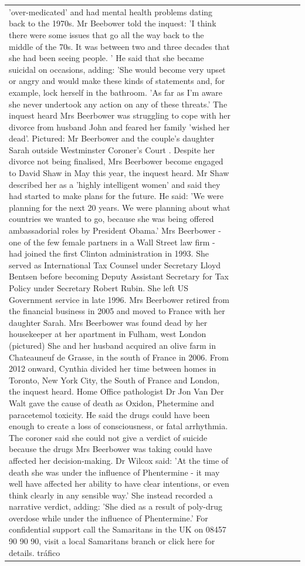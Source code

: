 \begin{table}[H]
\begin{tabular}{lllrlllll}
'over-medicated' and had mental health problems dating back to the 1970s. Mr Beebower told the inquest: 'I think there were some issues that go all the way back to the middle of the 70s. It was between two and three decades that she had been seeing people. ' He said that she became suicidal on occasions, adding: 'She would become very upset or angry and would make these kinds of statements and, for example, lock herself in the bathroom. 'As far as I'm aware she never undertook any action on any of these threats.' The inquest heard Mrs Beerbower was struggling to cope with her divorce from husband John and feared her family 'wished her dead'. Pictured: Mr Beerbower and the couple's daughter Sarah outside Westminster Coroner's Court . Despite her divorce not being finalised, Mrs Beerbower become engaged to David Shaw in May this year, the inquest heard. Mr Shaw described her as a 'highly intelligent women' and said they had started to make plans for the future. He said: 'We were planning for the next 20 years. We were planning about what countries we wanted to go, because she was being offered ambassadorial roles by President Obama.' Mrs Beerbower - one of the few female partners in a Wall Street law firm - had joined the first Clinton administration in 1993. She served as International Tax Counsel under Secretary Lloyd Bentsen before becoming Deputy Assistant Secretary for Tax Policy under Secretary Robert Rubin. She left US Government service in late 1996. Mrs Beerbower retired from the financial business in 2005 and moved to France with her daughter Sarah. Mrs Beerbower was found dead by her housekeeper at her apartment in Fulham, west London (pictured) She and her husband acquired an olive farm in Chateauneuf de Grasse, in the south of France in 2006. From 2012 onward, Cynthia divided her time between homes in Toronto, New York City, the South of France and London, the inquest heard. Home Office pathologist Dr Jon Van Der Walt gave the cause of death as Oxidon, Phetermine and paracetemol toxicity. He said the drugs could have been enough to create a loss of consciousness, or fatal arrhythmia. The coroner said she could not give a verdict of suicide because the drugs Mrs Beerbower was taking could have affected her decision-making. Dr Wilcox said: 'At the time of death she was under the influence of Phentermine - it may well have affected her ability to have clear intentions, or even think clearly in any sensible way.' She instead recorded a narrative verdict, adding: 'She died as a result of poly-drug overdose while under the influence of Phentermine.' For confidential support call the Samaritans in the UK on 08457 90 90 90, visit a local Samaritans branch or click here for details. tráfico \\

\end{tabular}
\end{table}
